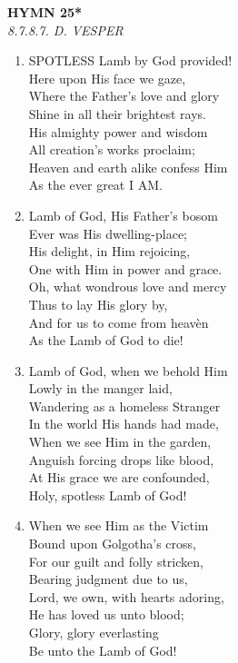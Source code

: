 \documentclass[11pt,a4paper]{article}
\begin{document}
\newpage
\begin{center}
    {\Large \textbf{HYMN 25*\textdagger{}}}
    \\
    \textit{8.7.8.7. D. VESPER}
\end{center}
\vspace{1em}

\begin{enumerate}
    \item SPOTLESS Lamb by God provided! \\
        Here upon His face we gaze, \\
        Where the Father's love and glory \\
        Shine in all their brightest rays. \\
        His almighty power and wisdom \\
        All creation's works proclaim; \\
        Heaven and earth alike confess Him \\
        As the ever great I AM.

    \item Lamb of God, His Father's bosom \\
        Ever was His dwelling-place; \\
        His delight, in Him rejoicing, \\
        One with Him in power and grace. \\
        Oh, what wondrous love and mercy \\
        Thus to lay His glory by, \\
        And for us to come from heav\`en \\
        As the Lamb of God to die!

    \item Lamb of God, when we behold Him \\
        Lowly in the manger laid, \\
        Wandering as a homeless Stranger \\
        In the world His hands had made, \\
        When we see Him in the garden, \\
        Anguish forcing drops like blood, \\
        At His grace we are confounded, \\
        Holy, spotless Lamb of God!

    \item When we see Him as the Victim \\
        Bound upon Golgotha's cross, \\
        For our guilt and folly stricken, \\
        Bearing judgment due to us, \\
        Lord, we own, with hearts adoring, \\
        He has loved us unto blood; \\
        Glory, glory everlasting \\
        Be unto the Lamb of God!

\end{enumerate}
\end{document}
